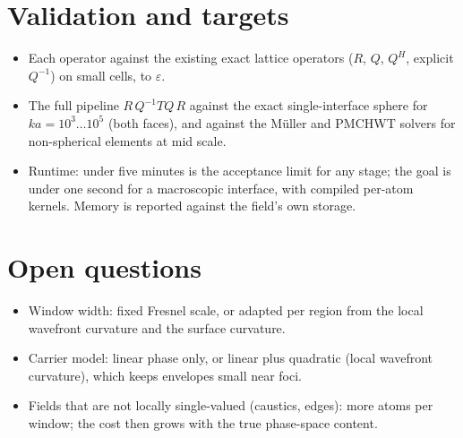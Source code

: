 \documentclass[11pt,a4paper]{article}
\begin{document}
\section{Validation and targets}
\begin{itemize}
\item Each operator against the existing exact lattice operators ($R$, $Q$,
$Q^H$, explicit $Q^{-1}$) on small cells, to $\varepsilon$.
\item The full pipeline $R\,Q^{-1}TQ\,R$ against the exact single-interface
sphere for $ka=10^3\ldots10^5$ (both faces), and against the Müller and
PMCHWT solvers for non-spherical elements at mid scale.
\item Runtime: under five minutes is the acceptance limit for any stage;
the goal is under one second for a macroscopic interface, with compiled
per-atom kernels. Memory is reported against the field's own storage.
\end{itemize}

\section{Open questions}
\begin{itemize}
\item Window width: fixed Fresnel scale, or adapted per region from the
local wavefront curvature and the surface curvature.
\item Carrier model: linear phase only, or linear plus quadratic (local
wavefront curvature), which keeps envelopes small near foci.
\item Fields that are not locally single-valued (caustics, edges): more
atoms per window; the cost then grows with the true phase-space content.
\end{itemize}
\end{document}
